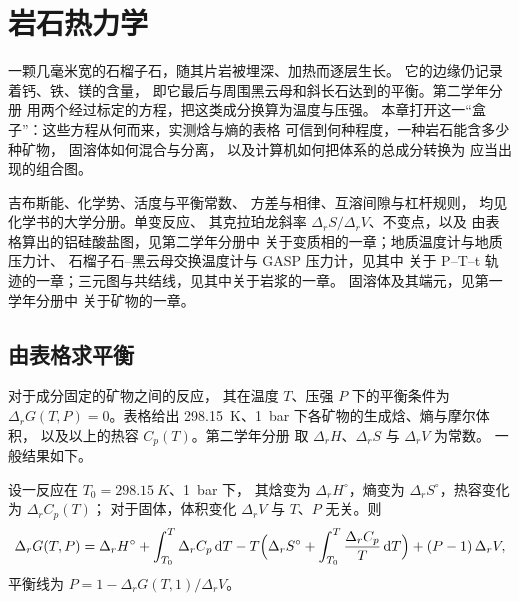 \chapter{岩石热力学}\label{ch:b3:petrological-thermodynamics}

一颗几毫米宽的石榴子石，随其片岩被埋深、加热而逐层生长。
它的边缘仍记录着钙、铁、镁的含量，
即它最后与周围黑云母和斜长石达到的平衡。第二学年分册
用两个经过标定的方程，把这类成分换算为温度与压强。
本章打开这一“盒子”：这些方程从何而来，实测焓与熵的表格
可信到何种程度，一种岩石能含多少种矿物，
固溶体如何混合与分离，
以及计算机如何把体系的总成分转换为
应当出现的组合图。

\begin{recall}
吉布斯能、化学势、活度与平衡常数、
方差与相律、互溶间隙与杠杆规则，
均见化学书的大学分册。单变反应、
其克拉珀龙斜率 $\Delta_rS/\Delta_rV$、不变点，以及
由表格算出的铝硅酸盐图，见第二学年分册中
关于变质相的一章；地质温度计与地质压力计、
石榴子石–黑云母交换温度计与 GASP 压力计，见其中
关于 P--T--t 轨迹的一章；三元图与共结线，见其中关于岩浆的一章。
固溶体及其端元，见第一学年分册中
关于矿物的一章。
\end{recall}

\section{由表格求平衡}\label{sec:b3:petrological-thermodynamics:tables}

对于成分固定的矿物之间的反应，
其在温度 $T$、压强 $P$ 下的平衡条件为 $\Delta_rG(T, P) = 0$。表格给出
\qty{298.15}{K}、\qty{1}{bar} 下各矿物的生成焓、熵与摩尔体积，
以及以上的热容 $C_p(T)$。第二学年分册
取 $\Delta_rH$、$\Delta_rS$ 与 $\Delta_rV$ 为常数。
一般结果如下。

\begin{theorem}[$T$ 与 $P$ 下反应的吉布斯能]\label{thm:b3:petrological-thermodynamics:dg}
设一反应在 $T_0 = \qty{298.15}{K}$、\qty{1}{bar} 下，
其焓变为 $\Delta_rH^\circ$，熵变为 $\Delta_rS^\circ$，热容变化为 $\Delta_rC_p(T)$；
对于固体，体积变化 $\Delta_rV$
与 $T$、$P$ 无关。则
\[
  \Delta_rG(T, P) = \Delta_rH^\circ + \int_{T_0}^{T}\Delta_rC_p\,\mathrm dT
  - T\Bigl(\Delta_rS^\circ + \int_{T_0}^{T}\frac{\Delta_rC_p}{T}\,\mathrm dT\Bigr)
  + (P - 1)\,\Delta_rV ,
\]
平衡线为 $P = 1 - \Delta_rG(T, 1)/\Delta_rV$。
\end{theorem}

